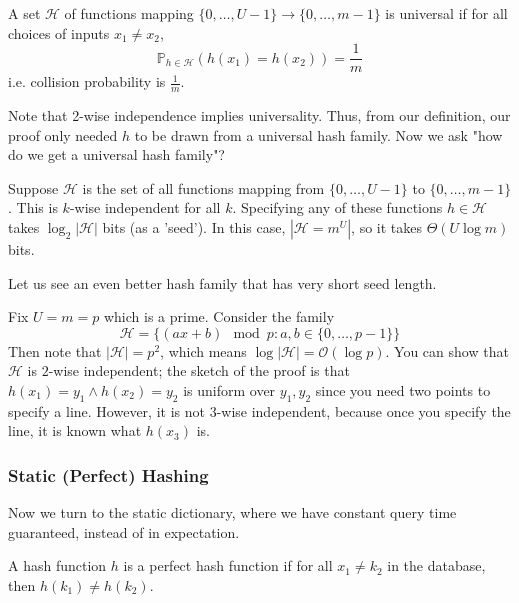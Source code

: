 \begin{definition}
    A set $\mathcal{H}$ of functions mapping $\{0, \dots, U - 1\} \rightarrow \{0, \dots, m - 1\}$ is universal if for all choices of inputs $x_1 \neq x_2$,
    \[ \mathbb{P}_{h \in \mathcal{H}} (h(x_1) = h(x_2)) = \frac{1}{m} \]
    i.e. collision probability is $\frac{1}{m}$.
\end{definition}

Note that 2-wise independence implies universality. Thus, from our definition, our proof only needed $h$ to be drawn from a universal hash family.
Now we ask "how do we get a universal hash family"?

\begin{example}
    Suppose $\mathcal{H}$ is the set of all functions mapping from $\{0, \dots, U - 1\}$ to $\{0, \dots, m - 1\}$. This is $k$-wise independent
    for all $k$. Specifying any of these functions $h \in \mathcal{H}$ takes $\log_2 |\mathcal{H}|$ bits (as a 'seed'). In this case, $|\mathcal{H} = m^U|$,
    so it takes $\Theta(U \log m)$ bits.
\end{example}

Let us see an even better hash family that has very short seed length.

\begin{example}
    Fix $U = m = p$ which is a prime.
    Consider the family
    \[ \mathcal{H} = \{ (a x + b) \mod{p} : a, b \in \{0, \dots, p - 1\}\} \]
    Then note that $|\mathcal{H}| = p^2$, which means $\log |\mathcal{H}| = \mathcal{O}(\log p)$. You can show that $\mathcal{H}$ is $2$-wise independent;
    the sketch of the proof is that $h(x_1) = y_1 \land h(x_2) = y_2$ is uniform over $y_1, y_2$ since you need two points to specify a line. However, it is not $3$-wise independent,
    because once you specify the line, it is known what $h(x_3)$ is.
\end{example}

\subsubsection{Static (Perfect) Hashing}
Now we turn to the static dictionary, where we have constant query time guaranteed, instead of in expectation.

\begin{definition}
    A hash function $h$ is a perfect hash function if for all $x_1 \neq k_2$ in the database, then $h(k_1) \neq h(k_2)$.
\end{definition}

